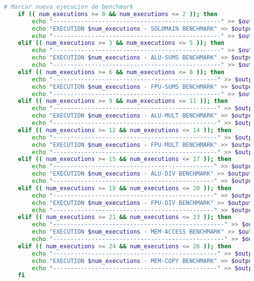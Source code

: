 \begin{lstlisting}[language=bash,caption={Programa de filtrado de estadísticas de Gem5},label=lst:getStats, showstringspaces=false,frame=single]
    # Marcar nueva ejecucion de benchmark
    if (( num_executions >= 0 && num_executions <= 2 )); then
        echo "------------------------------------------------" >> $output_file
        echo "EXECUTION $num_executions - SOLOMAIN BENCHMARK" >> $output_file
        echo "------------------------------------------------" >> $output_file
    elif (( num_executions >= 3 && num_executions <= 5 )); then
        echo "------------------------------------------------" >> $output_file
        echo "EXECUTION $num_executions - ALU-SUMS BENCHMARK" >> $output_file
        echo "------------------------------------------------" >> $output_file
    elif (( num_executions >= 6 && num_executions <= 8 )); then
        echo "-----------------------------------------------" >> $output_file
        echo "EXECUTION $num_executions - FPU-SUMS BENCHMARK" >> $output_file
        echo "------------------------------------------------" >> $output_file
    elif (( num_executions >= 9 && num_executions <= 11 )); then
        echo "-----------------------------------------------" >> $output_file
        echo "EXECUTION $num_executions - ALU-MULT BENCHMARK" >> $output_file
        echo "-----------------------------------------------" >> $output_file
    elif (( num_executions >= 12 && num_executions <= 14 )); then
        echo "-----------------------------------------------" >> $output_file
        echo "EXECUTION $num_executions - FPU-MULT BENCHMARK" >> $output_file
        echo "-----------------------------------------------" >> $output_file
    elif (( num_executions >= 15 && num_executions <= 17 )); then
        echo "----------------------------------------------" >> $output_file
        echo "EXECUTION $num_executions - ALU-DIV BENCHMARK" >> $output_file
        echo "----------------------------------------------" >> $output_file
    elif (( num_executions >= 18 && num_executions <= 20 )); then
        echo "----------------------------------------------" >> $output_file
        echo "EXECUTION $num_executions - FPU-DIV BENCHMARK" >> $output_file
        echo "----------------------------------------------" >> $output_file
    elif (( num_executions >= 21 && num_executions <= 23 )); then
        echo "-------------------------------------------------" >> $output_file
        echo "EXECUTION $num_executions - MEM-ACCESS BENCHMARK" >> $output_file
        echo "-------------------------------------------------" >> $output_file
    elif (( num_executions >= 24 && num_executions <= 26 )); then
        echo "-----------------------------------------------" >> $output_file
        echo "EXECUTION $num_executions - MEM-COPY BENCHMARK" >> $output_file
        echo "-----------------------------------------------" >> $output_file
    fi


\end{lstlisting}

